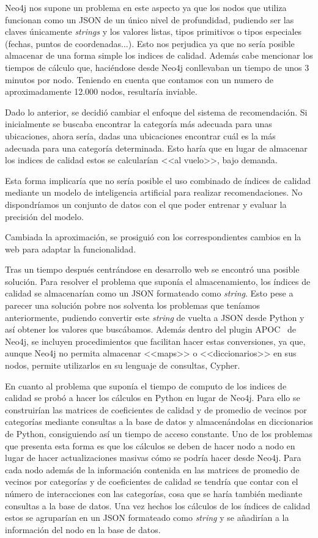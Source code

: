 Neo4j nos supone un problema en este aspecto ya que los nodos que utiliza funcionan como un JSON de un único nivel de profundidad, pudiendo ser las claves únicamente \textit{strings} y los valores listas, tipos primitivos o tipos especiales (fechas, puntos de coordenadas...). Esto nos perjudica ya que no sería posible almacenar de una forma simple los indices de calidad. Además cabe mencionar los tiempos de cálculo que, haciéndose desde Neo4j conllevaban un tiempo de unos 3 minutos por nodo. Teniendo en cuenta que contamos con un numero de aproximadamente 12.000 nodos, resultaría inviable.

Dado lo anterior, se decidió cambiar el enfoque del sistema de recomendación. Si inicialmente se buscaba encontrar la categoría más adecuada para unas ubicaciones, ahora sería, dadas una ubicaciones encontrar cuál es la más adecuada para una categoría determinada. Esto haría que en lugar de almacenar los indices de calidad estos se calcularían <<al vuelo>>, bajo demanda.

Esta forma implicaría que no sería posible el uso combinado de índices de calidad mediante un modelo de inteligencia artificial para realizar recomendaciones. No dispondríamos un conjunto de datos con el que poder entrenar y evaluar la precisión del modelo.

Cambiada la aproximación, se prosiguió con los correspondientes cambios en la web para adaptar la funcionalidad.

Tras un tiempo después centrándose en desarrollo web se encontró una posible solución. Para resolver el problema que suponía el almacenamiento, los índices de calidad se almacenarían como un JSON formateado como \textit{string}. Esto pese a parecer una solución pobre nos solventa los problemas que teníamos anteriormente, pudiendo convertir este \textit{string} de vuelta a JSON desde Python y así obtener los valores que buscábamos. Además dentro del plugin APOC~\cite{APOC} de Neo4j, se incluyen procedimientos que facilitan hacer estas conversiones, ya que, aunque Neo4j no permita almacenar <<maps>> o <<diccionarios>> en sus nodos, permite utilizarlos en su lenguaje de consultas, Cypher.

En cuanto al problema que suponía el tiempo de computo de los indices de calidad se probó a hacer los cálculos en Python en lugar de Neo4j. Para ello se construirían las matrices de coeficientes de calidad y de promedio de vecinos por categorías mediante consultas a la base de datos y almacenándolas en diccionarios de Python, consiguiendo así un tiempo de acceso constante. Uno de los problemas que presenta esta forma es que los cálculos se deben de hacer nodo a nodo en lugar de hacer actualizaciones masivas cómo se podría hacer desde Neo4j. Para cada nodo además de la información contenida en las matrices de promedio de vecinos por categorías y de coeficientes de calidad se tendría que contar con el número de interacciones con las categorías, cosa que se haría también mediante consultas a la base de datos. Una vez hechos los cálculos de los índices de calidad estos se agruparían en un JSON formateado como \textit{string} y se añadirían a la información del nodo en la base de datos.

